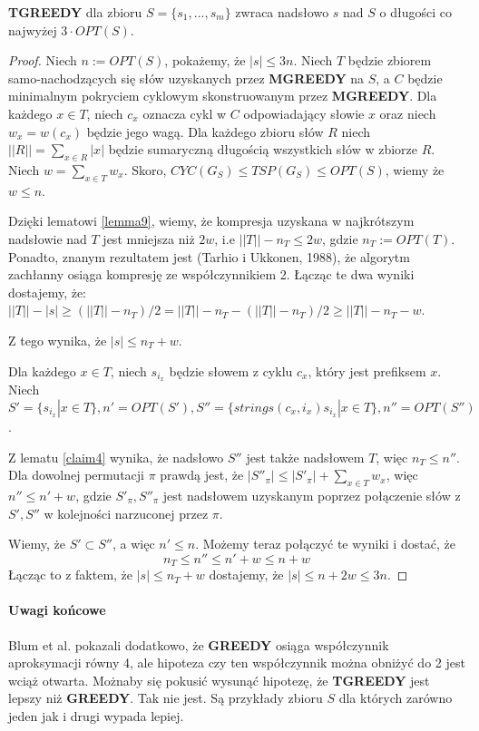 \begin{theorem}{}{}
\textbf{TGREEDY} dla zbioru $S = \{s_1, ..., s_m \}$ zwraca nadsłowo $s$ nad $S$ o długości co najwyżej $3\cdot OPT(S)$.
\end{theorem}
\begin{proof}
Niech $n:=OPT(S)$, pokażemy, że $|s| \leq 3n$. Niech $T$ będzie zbiorem samo-nachodzących się słów uzyskanych przez \textbf{MGREEDY}
na $S$, a $C$ będzie minimalnym pokryciem cyklowym skonstruowanym przez \textbf{MGREEDY}. Dla każdego $x\in T$, niech $c_x$ oznacza cykl w $C$ odpowiadający 
słowie $x$ oraz niech $w_x = w(c_x)$ będzie jego wagą. Dla każdego zbioru słów $R$ niech $||R|| = \sum_{x\in R}|x|$ będzie 
sumaryczną długością wszystkich słów w zbiorze $R$. Niech $w = \sum_{x\in T} w_x$. Skoro, 
$CYC(G_S) \leq TSP(G_S) \leq OPT(S)$, wiemy że $w \leq n$.

Dzięki lematowi \cref{lemma9}, wiemy, że kompresja uzyskana w najkrótszym nadsłowie nad $T$ jest mniejsza niż $2w$, 
i.e $||T|| - n_T \leq 2w$, gdzie $n_T := OPT(T)$. Ponadto, znanym rezultatem jest (Tarhio i Ukkonen, 1988), że 
algorytm zachłanny osiąga kompresję ze współczynnikiem 2. Łącząc te dwa wyniki dostajemy, że:
$||T|| - |s| \geq (||T|| - n_T)/2 = ||T|| - n_T - (||T||-n_T)/2 \geq ||T|| - n_T - w$.

Z tego wynika, że $|s| \leq n_T + w$.

Dla każdego $x\in T$, niech $s_{i_x}$ będzie słowem z cyklu $c_x$, który jest prefiksem $x$. 
Niech $S' = \{s_{i_x} | x\in T \}, n' = OPT(S'), S'' = \{ strings(c_x, i_x)s_{i_x}|x\in T\}, n'' = OPT(S'')$.

Z lematu \cref{claim4} wynika, że nadsłowo $S''$ jest także nadsłowem $T$, więc $n_T \leq n''$. Dla dowolnej permutacji 
$\pi$ prawdą jest, że $|S''_\pi| \leq |S'_\pi| + \sum_{x\in T}w_x$, więc $n'' \leq n' + w$, gdzie 
$S'_\pi, S''_\pi$ jest nadsłowem uzyskanym poprzez połączenie słów z $S', S''$ w kolejności narzuconej przez $\pi$.

Wiemy, że $S' \subset S''$, a więc $n' \leq n$. Możemy teraz połączyć te wyniki i dostać, że
\[n_T \leq n'' \leq n' + w \leq n + w \]
Łącząc to z faktem, że $|s| \leq n_T + w$ dostajemy, że $|s| \leq n + 2w \leq 3n$.
\end{proof}

\paragraph{Uwagi końcowe}

Blum et al. pokazali dodatkowo, że \textbf{GREEDY} osiąga współczynnik aproksymacji równy 4, ale hipoteza czy ten współczynnik można obniżyć do 2 jest wciąż otwarta. 
Możnaby się pokusić wysunąć hipotezę, że \textbf{TGREEDY} jest lepszy niż \textbf{GREEDY}. Tak nie jest. Są przykłady zbioru $S$ dla których zarówno jeden jak i drugi wypada lepiej. 

